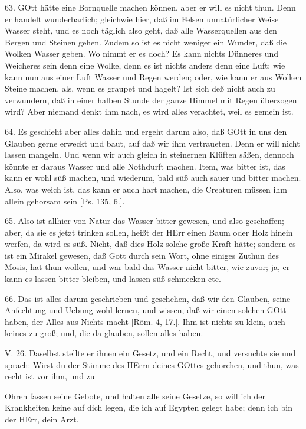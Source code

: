 63. GOtt hätte eine Bornquelle machen können, aber er will es nicht thun. Denn er handelt wunderbarlich; gleichwie hier, daß im Felsen unnatürlicher Weise Wasser steht, und es noch täglich also geht, daß alle Wasserquellen aus den Bergen und Steinen gehen. Zudem so ist es nicht weniger ein Wunder, daß die Wolken Wasser geben. Wo nimmt er es doch? Es kann nichts Dünneres und Weicheres sein denn eine Wolke, denn es ist nichts anders denn eine Luft; wie kann nun aus einer Luft Wasser und Regen werden; oder, wie kann er aus Wolken Steine machen, als, wenn es graupet und hagelt? Ist sich deß nicht auch zu verwundern, daß in einer halben Stunde der ganze Himmel mit Regen überzogen wird? Aber niemand denkt ihm nach, es wird alles verachtet, weil es gemein ist.

64. Es geschieht aber alles dahin und ergeht darum also, daß GOtt in uns den Glauben gerne erweckt und baut, auf daß wir ihm vertraueten. Denn er will nicht lassen mangeln. Und wenn wir auch gleich in steinernen Klüften säßen, dennoch könnte er daraus Wasser und alle Nothdurft machen. Item, was bitter ist, das kann er wohl süß machen, und wiederum, bald süß auch sauer und bitter machen. Also, was weich ist, das kann er auch hart machen, die Creaturen müssen ihm allein gehorsam sein [Ps. 135, 6.].

65. Also ist allhier von Natur das Wasser bitter gewesen, und also geschaffen; aber, da sie es jetzt trinken sollen, heißt der HErr einen Baum oder Holz hinein werfen, da wird es süß. Nicht, daß dies Holz solche große Kraft hätte; sondern es ist ein Mirakel gewesen, daß Gott durch sein Wort, ohne einiges Zuthun des Mosis, hat thun wollen, und war bald das Wasser nicht bitter, wie zuvor; ja, er kann es lassen bitter bleiben, und lassen süß schmecken etc.

66. Das ist alles darum geschrieben und geschehen, daß wir den Glauben, seine Anfechtung und Uebung wohl lernen, und wissen, daß wir einen solchen GOtt haben, der Alles aus Nichts macht [Röm. 4, 17.]. Ihm ist nichts zu klein, auch keines zu groß; und, die da glauben, sollen alles haben.

\begin{schriftzitat}
V. 26. Daselbst stellte er ihnen ein Gesetz, und ein Recht, und versuchte sie und sprach: Wirst du der Stimme des HErrn deines GOttes gehorchen, und thun, was recht ist vor ihm, und zu
\end{schriftzitat}

Ohren fassen seine Gebote, und halten alle seine Gesetze, so will ich der Krankheiten keine auf dich legen, die ich auf Egypten gelegt habe; denn ich bin der HErr, dein Arzt.


